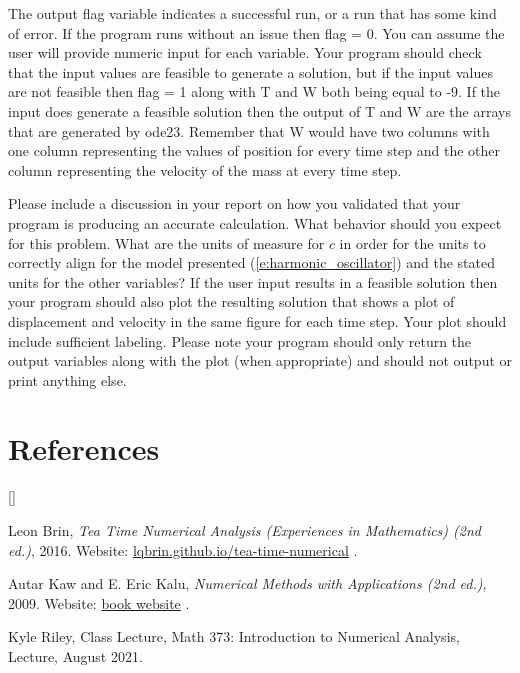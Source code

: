 \documentclass{article}
\def\beginrefs{\begin{list}%
        {[\arabic{equation}]}{\usecounter{equation}
         \setlength{\leftmargin}{2.0truecm}\setlength{\labelsep}{0.4truecm}%
         \setlength{\labelwidth}{1.6truecm}}}
\def\endrefs{\end{list}}
\def\bibentry#1{\item[\hbox{[#1]}]}
\begin{document}
The output flag variable indicates a successful run, or a run that has some kind of error. If the program runs without an issue then flag = 0. You can assume the user will provide numeric input for each variable. Your program should check that the input values are feasible to generate a solution, but if the input values are not feasible then flag = 1 along with T and W both being equal to -9. If the input does generate a feasible solution then the output of T and W are the arrays that are generated by ode23. Remember that W would have two columns with one column representing the values of position for every time step and the other column representing the velocity of the mass at every time step.  

Please include a discussion in your report on how you validated that your program is producing an accurate calculation. What behavior should you expect for this problem. What are the units of measure for $c$ in order for the units  to correctly align for the model presented (\ref{e:harmonic_oscillator}) and the stated units for the other variables?  If the user input results in a feasible solution then your program should also plot the resulting solution that shows a plot of displacement and velocity in the same figure for each time step. Your plot should include sufficient labeling. Please note your program should only return the output variables along with the plot (when appropriate) and should not output or print anything else. 

\par \bigskip \par

\section*{References}
\beginrefs

\bibentry{LB16}{\sc Leon Brin},
{\it Tea Time Numerical Analysis (Experiences in Mathematics)  (2nd ed.)}, 2016. Website: \href{http://lqbrin.github.io/tea-time-numerical/}{lqbrin.github.io/tea-time-numerical} .

\bibentry{KK09} {\sc Autar Kaw} and {\sc E. Eric Kalu}, {\it Numerical Methods with Applications (2nd ed.)}, 2009. Website: \href{http://autarkaw.com/books/numericalmethods/index.html}{book website} .

\bibentry{KR21} {\sc Kyle Riley}, Class Lecture, Math 373: Introduction to Numerical Analysis, Lecture, August 2021. 
\endrefs
\par \bigskip \noindent
\end{document}
